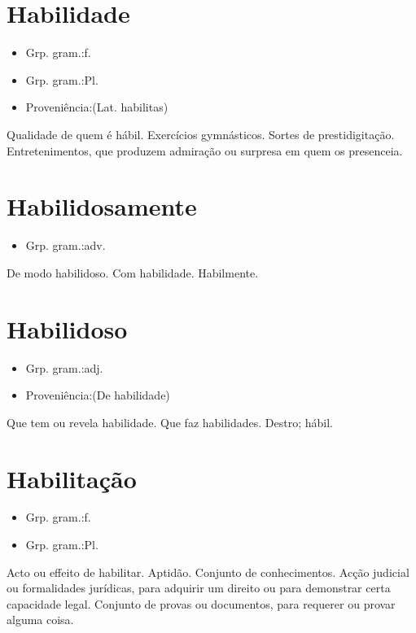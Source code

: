 \documentclass{article}
\begin{document}
\section{Habilidade}
\begin{itemize}
\item {Grp. gram.:f.}
\end{itemize}
\begin{itemize}
\item {Grp. gram.:Pl.}
\end{itemize}
\begin{itemize}
\item {Proveniência:(Lat. \textunderscore habilitas\textunderscore )}
\end{itemize}
Qualidade de quem é hábil.
Exercícios gymnásticos.
Sortes de prestidigitação.
Entretenimentos, que produzem admiração ou surpresa em quem os presenceia.
\section{Habilidosamente}
\begin{itemize}
\item {Grp. gram.:adv.}
\end{itemize}
De modo habilidoso.
Com habilidade.
Habilmente.
\section{Habilidoso}
\begin{itemize}
\item {Grp. gram.:adj.}
\end{itemize}
\begin{itemize}
\item {Proveniência:(De \textunderscore habilidade\textunderscore )}
\end{itemize}
Que tem ou revela habilidade.
Que faz habilidades.
Destro; hábil.
\section{Habilitação}
\begin{itemize}
\item {Grp. gram.:f.}
\end{itemize}
\begin{itemize}
\item {Grp. gram.:Pl.}
\end{itemize}
Acto ou effeito de habilitar.
Aptidão.
Conjunto de conhecimentos.
Acção judicial ou formalidades jurídicas, para adquirir um direito ou para demonstrar certa capacidade legal.
Conjunto de provas ou documentos, para requerer ou provar alguma coisa.
\end{document}
